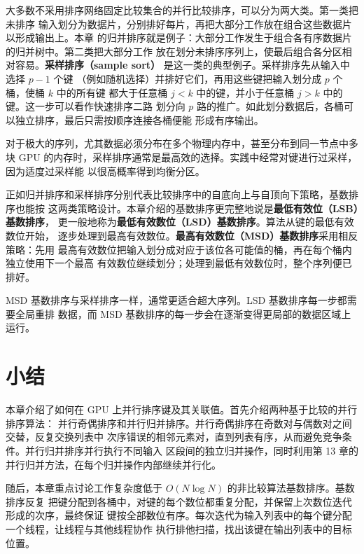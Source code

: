 大多数不采用排序网络固定比较集合的并行比较排序，可以分为两大类。第一类把未排序
输入划分为数据片，分别排好每片，再把大部分工作放在组合这些数据片以形成输出上。本章
的归并排序就是例子：大部分工作发生于组合各有序数据片的归并树中。第二类把大部分工作
放在划分未排序序列上，使最后组合各分区相对容易。\textbf{采样排序（sample sort）}
\cite{frazer1970samplesort}是这一类的典型例子。采样排序先从输入中选择 $p-1$ 个键
（例如随机选择）并排好它们，再用这些键把输入划分成 $p$ 个桶，使桶 $k$ 中的所有键
都大于任意桶 $j<k$ 中的键，并小于任意桶 $j>k$ 中的键。这一步可以看作快速排序二路
划分向 $p$ 路的推广。如此划分数据后，各桶可以独立排序，最后只需按顺序连接各桶便能
形成有序输出。

对于极大的序列，尤其数据必须分布在多个物理内存中，甚至分布到同一节点中多块 GPU
的内存时，采样排序通常是最高效的选择。实践中经常对键进行过采样，因为适度过采样能
以很高概率得到均衡分区\cite{blelloch1991comparison}。

正如归并排序和采样排序分别代表比较排序中的自底向上与自顶向下策略，基数排序也能按
这两类策略设计。本章介绍的基数排序更完整地说是\textbf{最低有效位（LSB）基数排序}，
更一般地称为\textbf{最低有效数位（LSD）基数排序}。算法从键的最低有效数位开始，
逐步处理到最高有效数位。\textbf{最高有效数位（MSD）基数排序}采用相反策略：先用
最高有效数位把输入划分成对应于该位各可能值的桶，再在每个桶内独立使用下一个最高
有效数位继续划分；处理到最低有效数位时，整个序列便已排好。

MSD 基数排序与采样排序一样，通常更适合超大序列。LSD 基数排序每一步都需要全局重排
数据，而 MSD 基数排序的每一步会在逐渐变得更局部的数据区域上运行。

\section{小结}
\label{sec:sorting-summary}

本章介绍了如何在 GPU 上并行排序键及其关联值。首先介绍两种基于比较的并行排序算法：
并行奇偶排序和并行归并排序。并行奇偶排序在奇数对与偶数对之间交替，反复交换列表中
次序错误的相邻元素对，直到列表有序，从而避免竞争条件。并行归并排序并行执行不同输入
区段间的独立归并操作，同时利用第 13 章的并行归并方法，在每个归并操作内部继续并行化。

随后，本章重点讨论工作复杂度低于 $O(N\log N)$ 的非比较算法基数排序。基数排序反复
把键分配到各桶中，对键的每个数位都重复分配，并保留上次数位迭代形成的次序，最终保证
键按全部数位有序。每次迭代为输入列表中的每个键分配一个线程，让线程与其他线程协作
执行排他扫描，找出该键在输出列表中的目标位置。

